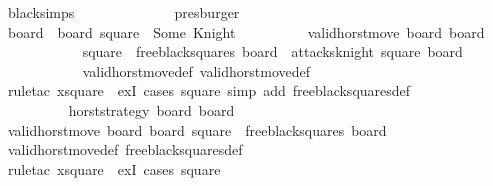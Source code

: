 \begin{isabellebody}
\ black{\isachardot}simps\isanewline
\ \ \ \ \ \ \ \ \ \ \ \ \isamarkupfalse%
\ presburger\isanewline
\ \ \ \ \ \ \ \ \isamarkupfalse%
\isanewline
\ \ \ \ \ \ \ \ \ \ \isanewline
\ \ \ \ \ \ \ \ \isamarkupfalse%
\ {\isacharquery}board{}\ {\isacharequal}\ {\isachardoublequoteopen}board\ {\isacharparenleft}square\ {\isacharcolon}{\isacharequal}\ Some\ Knight{\isacharparenright}{\isachardoublequoteclose}\isanewline
\ \ \ \ \ \ \ \ \isamarkupfalse%
\ {\isachardoublequoteopen}valid{\isacharunderscore}horst{\isacharunderscore}move\ board\ {\isacharquery}board{}{\isachardoublequoteclose}\isanewline
\ \ \ \ \ \ \ \ \ \ \isamarkupfalse%
\ {\isacharbackquoteopen}square\ {\isasymin}\ free{\isacharunderscore}black{\isacharunderscore}squares\ board{\isacharbackquoteclose}\ {\isacharbackquoteopen}{\isasymnot}\ attacks{\isacharunderscore}knight\ square\ board{\isacharbackquoteclose}\isanewline
\ \ \ \ \ \ \ \ \ \ \isamarkupfalse%
\ valid{\isacharunderscore}horst{\isacharunderscore}move{\isacharunderscore}def\ valid{\isacharunderscore}horst{\isacharunderscore}move{\isacharprime}{\isacharunderscore}def\isanewline
\ \ \ \ \ \ \ \ \ \ \isamarkupfalse%
\ {\isacharparenleft}rule{\isacharunderscore}tac\ x{\isacharequal}square\ \ exI{\isacharcomma}\ cases\ square{\isacharcomma}\ simp\ add{\isacharcolon}\ free{\isacharunderscore}black{\isacharunderscore}squares{\isacharunderscore}def{\isacharparenright}\isanewline
\isanewline
\ \ \ \ \ \ \ \ \isamarkupfalse%
\isanewline
\isanewline
\ \ \ \ \ \ \ \ \isamarkupfalse%
\ {\isachardoublequoteopen}{\isacharquery}horst{\isacharunderscore}strategy\ board\ {\isacharquery}board{}{\isachardoublequoteclose}\isanewline
\ \ \ \ \ \ \ \ \ \ \isamarkupfalse%
\ {\isacharbackquoteopen}valid{\isacharunderscore}horst{\isacharunderscore}move\ board\ {\isacharquery}board{}{\isacharbackquoteclose}\ {\isacharbackquoteopen}square\ {\isasymin}\ free{\isacharunderscore}black{\isacharunderscore}squares\ board{\isacharbackquoteclose}\isanewline
\ \ \ \ \ \ \ \ \ \ \isamarkupfalse%
\ valid{\isacharunderscore}horst{\isacharunderscore}move{\isacharunderscore}def\ free{\isacharunderscore}black{\isacharunderscore}squares{\isacharunderscore}def\isanewline
\ \ \ \ \ \ \ \ \ \ \isamarkupfalse%
\ {\isacharparenleft}rule{\isacharunderscore}tac\ x{\isacharequal}square\ \ exI{\isacharcomma}\ cases\ square{\isacharparenright}\isanewline

\end{isabellebody}
